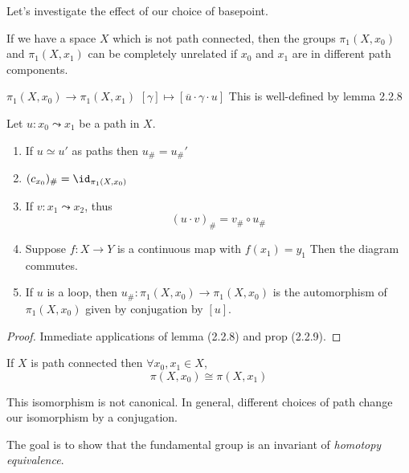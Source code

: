 \documentclass{article}
\numberwithin{nthm}{subsection}
\begin{document}
Let's investigate the effect of our choice of basepoint.

If we have a space $X$ which is not path connected, then the groups $\pi_1(X, x_0)$ and $\pi_1(X, x_1)$ can be completely unrelated if $x_0$ and $x_1$ are in different path components.

$\pi_1(X, x_0) \to \pi_1(X, x_1)$
$[\gamma] \mapsto [\overline{u} \cdot \gamma \cdot u]$
This is well-defined by lemma 2.2.8

\begin{prop}
    Let $u: x_0 \leadsto x_1$ be a path in $X$.
    \begin{enumerate}[label=(\roman*)]
        \setcounter{enumi}{0}
        \item If $u \simeq u'$ as paths then $u_{\#} = u_{\#}'$
        \item $(c_{x_0})_{\#} = \id_{\pi_1(X, x_0)}$
        \item If $v: x_1 \leadsto x_2$, thus
            \begin{equation*}
                (u \cdot v)_{\#} = v_{\#} \circ u_{\#}
            \end{equation*}

        \item Suppose $f:X \to Y$ is a continuous map with $f(x_1) = y_1$
                Then the diagram commutes.
        \item If $u$ is a loop, then $u_{\#}: \pi_1(X, x_0) \to \pi_1(X, x_0)$ is the automorphism of $\pi_1(X, x_0)$ given by conjugation by $[u]$.
    \end{enumerate}
\end{prop}

\begin{proof}
    Immediate applications of lemma (2.2.8) and prop (2.2.9).
\end{proof}

\begin{cor}
    If $X$ is path connected then $\forall x_0, x_1 \in X$,
    \begin{equation*}
        \pi(X, x_0) \cong \pi(X, x_1)
    \end{equation*}
\end{cor}

\begin{warning}
    This isomorphism is not canonical. In general, different choices of path change our isomorphism by a conjugation.
\end{warning}

The goal is to show that the fundamental group is an invariant of \emph{homotopy equivalence}.
\end{document}

